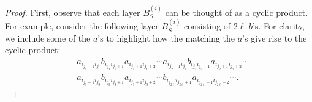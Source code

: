 \documentclass[11pt,reqno]{amsart}
\numberwithin{equation}{section}
\theoremstyle{plain}
\begin{document}
\begin{proof}


First, observe that each layer $B^{(i)}_{S}$ can be thought of as a cyclic product. For example, consider the following layer $B^{(i)}_S$ consisting of $2\ell$ $b$'s. For clarity, we include some of the $a$'s to highlight how the matching the $a$'s give rise to the cyclic product:
\begin{align}
& a_{i_{j_1-1}i_{j_1}}b_{i_{j_1}i_{j_1+1}}a_{i_{j_1+1}i_{j_1+2}}\cdots a_{i_{j_2-1}i_{j_2}}b_{i_{j_2}i_{j_2+1}}a_{i_{j_2+1}i_{j_2+2}}\cdots \nonumber \\&a_{i_{j_3-1}i_{j_3}}b_{i_{j_3}i_{j_3+1}}a_{i_{j_3+1}i_{j_3+2}}\cdots b_{i_{j_{2\ell}}i_{j_{2\ell}+1}}a_{i_{j_{2\ell}+1}i_{j_{2\ell}+2}}\cdots.
\end{align}


\end{proof}
\end{document}
